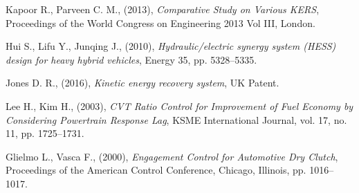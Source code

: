 \documentclass[11pt]{article}
\begin{document}
\begin{thebibliography}{60}
	Kapoor R., Parveen C. M., (2013), \textit{Comparative Study on Various KERS},   	Proceedings of the World Congress on Engineering 2013 Vol III, London.
	
	Hui S., Lifu Y., Junqing J., (2010), \textit{Hydraulic/electric synergy   	 	    system (HESS) design for heavy hybrid vehicles}, Energy 35, pp. 5328--5335.
	
	Jones D. R., (2016), \textit{Kinetic energy recovery system},
	UK Patent.  
	
	Lee H., Kim H., (2003), \textit{CVT Ratio Control for Improvement of Fuel Economy
	by Considering Powertrain Response Lag}, KSME International Journal, vol. 17, no. 11, pp. 1725--1731. 
	
	Glielmo L., Vasca F., (2000), \textit{Engagement Control for Automotive Dry Clutch}, Proceedings of the American Control Conference, Chicago, Illinois, pp. 1016--1017.
	
	
\end{thebibliography}
\end{document}
